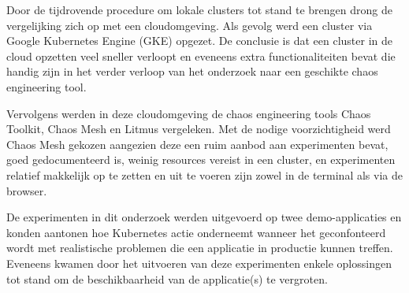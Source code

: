 Door de tijdrovende procedure om lokale clusters tot stand te brengen drong de vergelijking zich op met een cloudomgeving. Als gevolg werd een cluster via Google Kubernetes Engine (GKE) opgezet. De conclusie is dat een cluster in de cloud opzetten veel sneller verloopt en eveneens extra functionaliteiten bevat die handig zijn in het verder verloop van het onderzoek naar een geschikte chaos engineering tool.  

Vervolgens werden in deze cloudomgeving de chaos engineering tools Chaos Toolkit, Chaos Mesh en Litmus vergeleken. Met de nodige voorzichtigheid werd Chaos Mesh gekozen aangezien deze een ruim aanbod aan experimenten bevat, goed gedocumenteerd is, weinig resources vereist in een cluster, en experimenten relatief makkelijk op te zetten en uit te voeren zijn zowel in de terminal als via de browser.

De experimenten in dit onderzoek werden uitgevoerd op twee demo-applicaties en konden aantonen hoe Kubernetes actie onderneemt wanneer het geconfonteerd wordt met realistische problemen die een applicatie in productie kunnen treffen. Eveneens kwamen door het uitvoeren van deze experimenten enkele oplossingen tot stand om de beschikbaarheid van de applicatie(s) te vergroten.    
